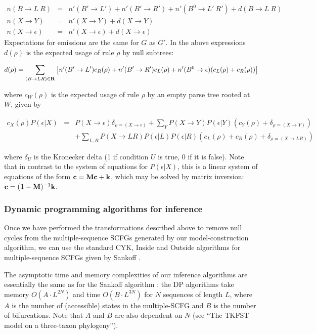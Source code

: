 \documentclass[10pt]{article}
\begin{document}
\begin{eqnarray*}
    n(B \to L\ R) & = & n'(B' \to L') + n'(B' \to R') + n'(B^0 \to L'\ R') + d(B \to L\ R) \\
       n(X \to Y) & = & n'(X \to Y) + d(X \to Y) \\
n(X \to \epsilon) & = & n'(X \to \epsilon) + d(X \to \epsilon)
\end{eqnarray*}
Expectations for emissions are the same for $G$ as $G'$.
In the above expressions $d(\rho)$ is the expected usage of rule $\rho$ by null subtrees:

\[
d(\rho) = \sum_{(B \to LR) \in {\bf R}} \left[
n'(B' \to L') c_R(\rho)
+ n'(B' \to R') c_L(\rho)
+ n'(B^0 \to \epsilon) (c_L(\rho) + c_R(\rho))
\right]
\]

where $c_W(\rho)$ is the expected usage of rule $\rho$ by an empty parse tree rooted at $W$,
given by

\begin{eqnarray*}
c_X(\rho) P(\epsilon | X) & = & P(X \to \epsilon) \delta_{\rho=(X \to \epsilon)}
 + \sum_Y P(X \to Y) P(\epsilon|Y) \left( c_Y(\rho) + \delta_{\rho=(X \to Y)} \right)
\\ & &
 + \sum_{L,R} P(X \to LR) P(\epsilon|L) P(\epsilon|R) \left( c_L(\rho) + c_R(\rho) + \delta_{\rho=(X \to LR)} \right)
\end{eqnarray*}

where $\delta_U$ is the Kronecker delta (1 if condition $U$ is true, 0 if it is false).
Note that in contrast to the system of equations for $P(\epsilon|X)$, this is a linear system of equations
of the form ${\bf c} = {\bf Mc} + {\bf k}$, which may be solved by matrix inversion:
${\bf c} = ({\bf 1}-{\bf M})^{-1} {\bf k}$.


\subsubsection*{Dynamic programming algorithms for inference}

Once we have performed the transformations described above to remove
null cycles from the multiple-sequence SCFGs generated by our
model-construction algorithm, we can use the standard CYK, Inside and
Outside algorithms for multiple-sequence SCFGs given by Sankoff \cite{Sankoff85}.

The asymptotic time and memory complexities of our inference algorithms
are essentially the same as for the Sankoff algorithm \cite{Sankoff85}:
the DP algorithms take memory $O(A \cdot L^{2N})$ and time $O(B \cdot L^{3N})$
for $N$ sequences of length $L$, where $A$ is the number of
(accessible) states in the multiple-SCFG and $B$ is the number of
bifurcations.
Note that $A$ and $B$ are also dependent on $N$ (see ``The TKFST model
on a three-taxon phylogeny'').
\end{document}
